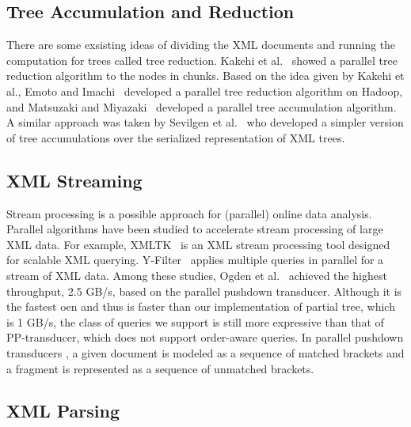 \subsection{Tree Accumulation and Reduction}

There are some exsisting ideas of dividing the XML documents and running the
computation for trees called tree reduction. Kakehi et al.~\cite{KaME07} showed
a parallel tree reduction algorithm to the nodes in chunks. Based on the idea
given by Kakehi et al., Emoto and Imachi~\cite{EmIm12} developed a parallel tree
reduction algorithm on Hadoop, and Matsuzaki and Miyazaki~\cite{MaMi16}
developed a parallel tree accumulation algorithm. A similar approach was taken
by Sevilgen et al.~\cite{SAFu05} who developed a simpler version of tree
accumulations over the serialized representation of XML trees.

\subsection{XML Streaming}

Stream processing is a possible approach for (parallel) online data analysis.
Parallel algorithms have been studied to accelerate stream processing of large
XML data. For example, XMLTK~\cite{AGGR02} is an XML stream processing tool
designed for scalable XML querying. Y-Filter~\cite{ZhPC10} applies multiple
queries in parallel for a stream of XML data. Among these studies, Ogden et
al.~\cite{OgTP13} achieved the highest throughput, 2.5 GB/s, based on the
parallel pushdown transducer. Although it is the fastest oen and thus is faster
than our implementation of partial tree, which is 1 GB/s, the class of queries
we support is still more expressive than that of PP-transducer, which does not
support order-aware queries. In parallel pushdown transducers \cite{LiZZ17}, a
given document is modeled as a sequence of matched brackets and a fragment is
represented as a sequence of unmatched brackets.

\subsection{XML Parsing}

